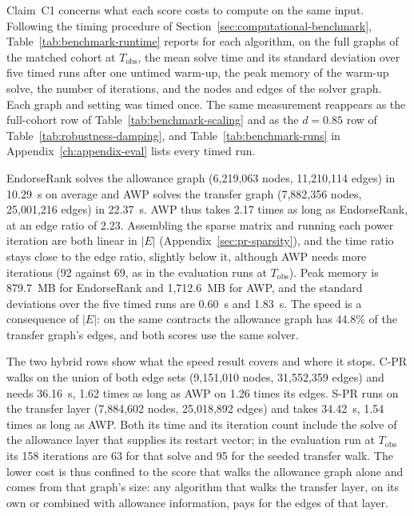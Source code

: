 
Claim~C1 concerns what each score costs to compute on the same input. Following the timing procedure of Section~\ref{sec:computational-benchmark}, Table~\ref{tab:benchmark-runtime} reports for each algorithm, on the full graphs of the matched cohort at $T_{\mathrm{obs}}$, the mean solve time and its standard deviation over five timed runs after one untimed warm-up, the peak memory of the warm-up solve, the number of iterations, and the nodes and edges of the solver graph. Each graph and setting was timed once. The same measurement reappears as the full-cohort row of Table~\ref{tab:benchmark-scaling} and as the $d=0.85$ row of Table~\ref{tab:robustness-damping}, and Table~\ref{tab:benchmark-runs} in Appendix~\ref{ch:appendix-eval} lists every timed run.


EndorseRank solves the allowance graph (6,219,063 nodes, 11,210,114 edges) in 10.29~s on average and AWP solves the transfer graph (7,882,356 nodes, 25,001,216 edges) in 22.37~s. AWP thus takes 2.17 times as long as EndorseRank, at an edge ratio of 2.23. Assembling the sparse matrix and running each power iteration are both linear in $|E|$ (Appendix~\ref{sec:pr-sparsity}), and the time ratio stays close to the edge ratio, slightly below it, although AWP needs more iterations (92 against 69, as in the evaluation runs at $T_{\mathrm{obs}}$). Peak memory is 879.7~MB for EndorseRank and 1,712.6~MB for AWP, and the standard deviations over the five timed runs are 0.60~s and 1.83~s. The speed is a consequence of $|E|$: on the same contracts the allowance graph has 44.8\% of the transfer graph's edges, and both scores use the same solver.

The two hybrid rows show what the speed result covers and where it stops. C-PR walks on the union of both edge sets (9,151,010 nodes, 31,552,359 edges) and needs 36.16~s, 1.62 times as long as AWP on 1.26 times its edges. S-PR runs on the transfer layer (7,884,602 nodes, 25,018,892 edges) and takes 34.42~s, 1.54 times as long as AWP. Both its time and its iteration count include the solve of the allowance layer that supplies its restart vector; in the evaluation run at $T_{\mathrm{obs}}$ its 158 iterations are 63 for that solve and 95 for the seeded transfer walk. The lower cost is thus confined to the score that walks the allowance graph alone and comes from that graph's size: any algorithm that walks the transfer layer, on its own or combined with allowance information, pays for the edges of that layer.

